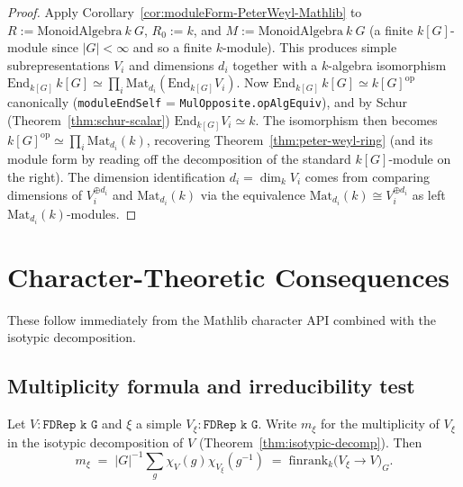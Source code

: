 \begin{proof}
  Apply Corollary~\ref{cor:moduleForm-PeterWeyl-Mathlib} to
  $R := \mathrm{MonoidAlgebra}\ k\ G$, $R_0 := k$, and
  $M := \mathrm{MonoidAlgebra}\ k\ G$ (a finite $k[G]$-module since
  $|G| < \infty$ and so a finite $k$-module). This produces simple
  subrepresentations $V_i$ and dimensions $d_i$ together with a
  $k$-algebra isomorphism
  $\mathrm{End}_{k[G]}\,k[G] \simeq \prod_i \mathrm{Mat}_{d_i}(\mathrm{End}_{k[G]} V_i)$.
  Now $\mathrm{End}_{k[G]}\,k[G] \simeq k[G]^{\mathrm{op}}$ canonically
  (\texttt{moduleEndSelf} = \texttt{MulOpposite.opAlgEquiv}), and by Schur
  (Theorem~\ref{thm:schur-scalar})
  $\mathrm{End}_{k[G]} V_i \simeq k$. The isomorphism then becomes
  $k[G]^{\mathrm{op}} \simeq \prod_i \mathrm{Mat}_{d_i}(k)$, recovering
  Theorem~\ref{thm:peter-weyl-ring} (and its module form by reading off the
  decomposition of the standard $k[G]$-module on the right). The dimension
  identification $d_i = \dim_k V_i$ comes from comparing dimensions of
  $V_i^{\oplus d_i}$ and $\mathrm{Mat}_{d_i}(k)$ via the equivalence
  $\mathrm{Mat}_{d_i}(k) \cong V_i^{\oplus d_i}$ as left $\mathrm{Mat}_{d_i}(k)$-modules.
\end{proof}


\chapter{Character-Theoretic Consequences}
\label{chap:character-consequences}

These follow immediately from the Mathlib character API combined with the
isotypic decomposition.

\section{Multiplicity formula and irreducibility test}

\begin{theorem}
  \label{thm:multiplicity-formula}
  Let $V : \texttt{FDRep k G}$ and $\xi$ a simple $V_\xi : \texttt{FDRep k G}$.
  Write $m_\xi$ for the multiplicity of $V_\xi$ in the isotypic decomposition
  of $V$ (Theorem~\ref{thm:isotypic-decomp}). Then
  \[
     m_\xi \;=\; |G|^{-1}\sum_{g} \chi_V(g)\chi_{V_\xi}(g^{-1})
     \;=\; \mathrm{finrank}_k\bigl(V_\xi \to V\bigr)_G.
  \]
\end{theorem}

